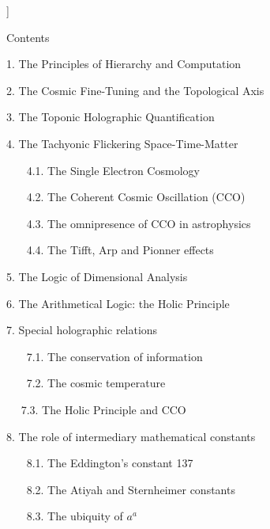 \documentclass[twoside,draft]{article}
\begin{document}
\begin{sloppypar}
\begin{center}
{{%

}}\smallskip
\end{center}]{%


\setcounter{section}{0}
\setcounter{equation}{0}
\setcounter{figure}{0}
\setcounter{table}{0}
\setcounter{page}{1}


Contents

1. The Principles of Hierarchy and Computation

2. The Cosmic Fine-Tuning and the Topological Axis

3. The Toponic Holographic Quantification

4. The Tachyonic Flickering Space-Time-Matter}

~~~   4.1. The Single Electron Cosmology
   
~~~    4.2. The Coherent Cosmic Oscillation (CCO)
   
~~~    4.3. The omnipresence of CCO in astrophysics
   
~~~    4.4. The Tifft, Arp and Pionner effects
   
5. The Logic of Dimensional Analysis

6. The Arithmetical Logic: the Holic Principle

7. Special holographic relations

~~~    7.1. The conservation of information
   
~~~    7.2. The cosmic temperature

~~     7.3. The Holic Principle and CCO 
    
8. The role of intermediary mathematical constants

~~~    8.1. The Eddington's constant 137
   
~~~    8.2. The Atiyah and Sternheimer constants
   
~~~    8.3. The ubiquity of $a^a$
   

\end{sloppypar}
\end{document}
